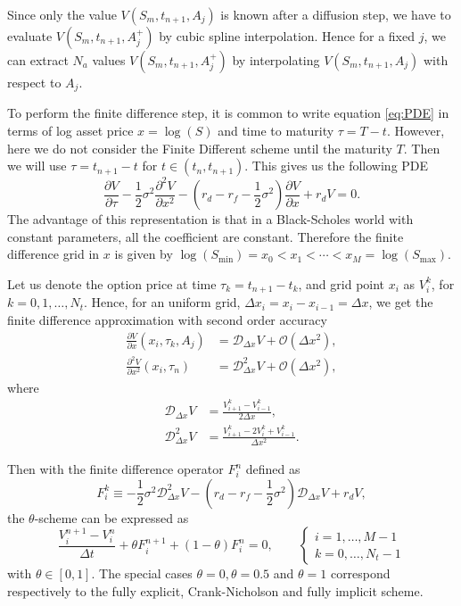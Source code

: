 Since only the value $V(S_m,t_{n+1},A_j)$ is known after a diffusion step, we have to evaluate $V(S_m,t_{n+1},A_j^+)$ by cubic spline interpolation. Hence for a fixed $j$, we can extract $N_a$ values $V(S_m,t_{n+1},A_j^+)$ by interpolating $V(S_m,t_{n+1},A_j)$ with respect to $A_j$.

To perform the finite difference step, it is common to write equation \eqref{eq:PDE} in terms of log asset price $x = \log(S)$ and time to maturity $\tau=T-t$. However, here we do not consider the Finite Different scheme until the maturity $T$. Then we will use $\tau = t_{n+1}-t$ for $t\in(t_n,t_{n+1})$. This gives us the following PDE
$$\frac{\partial V}{\partial \tau}-\frac{1}{2}\sigma^2\frac{\partial^2 V}{\partial x^2}-\left(r_d - r_f - \frac{1}{2}\sigma^2\right)\frac{\partial V}{\partial x}+r_d V = 0.$$
The advantage of this representation is that in a Black-Scholes world with constant parameters, all the coefficient are constant. Therefore the finite difference grid in $x$ is given by $\log(S_{\min}) = x_0 < x_1<\cdots<x_M = \log(S_{\max})$. 

Let us denote the option price at time $\tau_k = t_{n+1}-t_k$, and grid point $x_i$ as $V_i^k$, for $k=0,1,\ldots, N_t$. Hence, for an uniform grid, $\Delta x_i = x_i-x_{i-1} = \Delta x$, we get the finite difference approximation with second order accuracy 
\begin{align*}
\frac{\partial V}{\partial x}(x_i,\tau_k,A_j) &= \mathcal{D}_{\Delta x} V +\mathcal{O}(\Delta x^2),\\
\frac{\partial^2 V}{\partial x^2}(x_i,\tau_n) &= \mathcal{D}_{\Delta x}^2 V+\mathcal{O}(\Delta x^2),
\end{align*}
where 
\begin{align*}
\mathcal{D}_{\Delta x} V&= \frac{V_{i+1}^k-V_{i-1}^k}{2\Delta x},\\
\mathcal{D}^2_{\Delta x}V &= \frac{V_{i+1}^k-2V_i^k+V_{i-1}^k}{\Delta x^2}.
\end{align*}

Then with the finite difference operator $F_i^n$ defined as
$$F_i^k \equiv -\frac{1}{2}\sigma^2\mathcal{D}_{\Delta x}^2V-\left(r_d - r_f - \frac{1}{2}\sigma^2\right)\mathcal{D}_{\Delta x}V+r_d V,$$
the $\theta$-scheme can be expressed as
$$\frac{V_i^{n+1}-V_i^n}{\Delta t}+\theta F_i^{n+1} +(1-\theta)F_i^n=0,\qquad \begin{cases}i = 1,\ldots, M-1\\k = 0,\ldots,N_t-1 \end{cases}$$
with $\theta\in[0,1]$. The special cases $\theta=0,\theta=0.5$ and $\theta=1$ correspond respectively to the fully explicit, Crank-Nicholson and fully implicit scheme.

